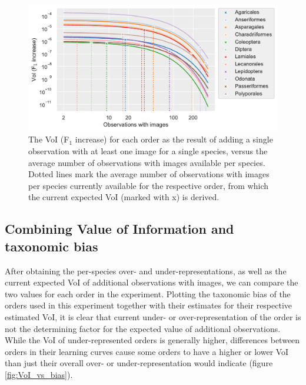 \documentclass{article}
\begin{document}
\begin{figure}[!ht]
  \includegraphics[width=\textwidth]{3}
  \caption{\footnotesize The VoI (F\(_1\) increase) for each order as the result of adding a single observation with at least one image for a single species, versus the average number of observations with images available per species. Dotted lines mark the average number of observations with images per species currently available for the respective order, from which the current expected VoI (marked with x) is derived.}
  \label{fig:VoI_curves}
\end{figure}

\subsection*{Combining Value of Information and taxonomic bias}
After obtaining the per-species over- and under-representations, as well as the current expected VoI of additional observations with images, we can compare the two values for each order in the experiment. Plotting the taxonomic bias of the orders used in this experiment together with their estimates for their respective estimated VoI, it is clear that current under- or over-representation of the order is not the determining factor for the expected value of additional observations. While the VoI of under-represented orders is generally higher, differences between orders in their learning curves cause some orders to have a higher or lower VoI than just their overall over- or under-representation would indicate (figure \ref{fig:VoI_vs_bias}).
\end{document}
